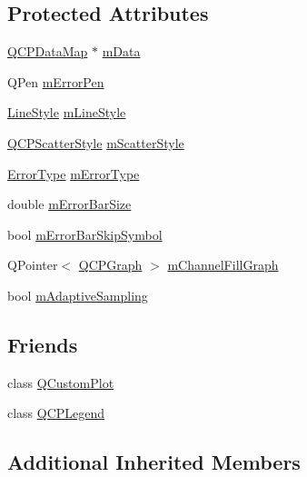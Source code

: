 \subsection*{Protected Attributes}
\begin{DoxyCompactItemize}
\item 
\hyperlink{qcustomplot_8h_a84a9c4a4c2216ccfdcb5f3067cda76e3}{Q\+C\+P\+Data\+Map} $\ast$ \hyperlink{class_q_c_p_graph_a8457c840f69a0ac49f61d30a509c5d08}{m\+Data}
\item 
Q\+Pen \hyperlink{class_q_c_p_graph_aa35681a24165c2831301091a87b662ce}{m\+Error\+Pen}
\item 
\hyperlink{class_q_c_p_graph_ad60175cd9b5cac937c5ee685c32c0859}{Line\+Style} \hyperlink{class_q_c_p_graph_a8604fd98402035a63375849f7341ee25}{m\+Line\+Style}
\item 
\hyperlink{class_q_c_p_scatter_style}{Q\+C\+P\+Scatter\+Style} \hyperlink{class_q_c_p_graph_a4aa36241f166ccd1f75fc8f24e4a3247}{m\+Scatter\+Style}
\item 
\hyperlink{class_q_c_p_graph_ad23b514404bd2cb3216f57c90904d6af}{Error\+Type} \hyperlink{class_q_c_p_graph_a29e64273db201aeadebc61c870720a36}{m\+Error\+Type}
\item 
double \hyperlink{class_q_c_p_graph_a7b51c8d09510f9d195b5e765ccbcf05b}{m\+Error\+Bar\+Size}
\item 
bool \hyperlink{class_q_c_p_graph_acf631d7dbd1055a69ab3b63094868557}{m\+Error\+Bar\+Skip\+Symbol}
\item 
Q\+Pointer$<$ \hyperlink{class_q_c_p_graph}{Q\+C\+P\+Graph} $>$ \hyperlink{class_q_c_p_graph_a2f1777c7accf8244fc640c33f0b04577}{m\+Channel\+Fill\+Graph}
\item 
bool \hyperlink{class_q_c_p_graph_aa951e78aeba714cf443be6da2e52502e}{m\+Adaptive\+Sampling}
\end{DoxyCompactItemize}
\subsection*{Friends}
\begin{DoxyCompactItemize}
\item 
class \hyperlink{class_q_c_p_graph_a1cdf9df76adcfae45261690aa0ca2198}{Q\+Custom\+Plot}
\item 
class \hyperlink{class_q_c_p_graph_a8429035e7adfbd7f05805a6530ad5e3b}{Q\+C\+P\+Legend}
\end{DoxyCompactItemize}
\subsection*{Additional Inherited Members}


